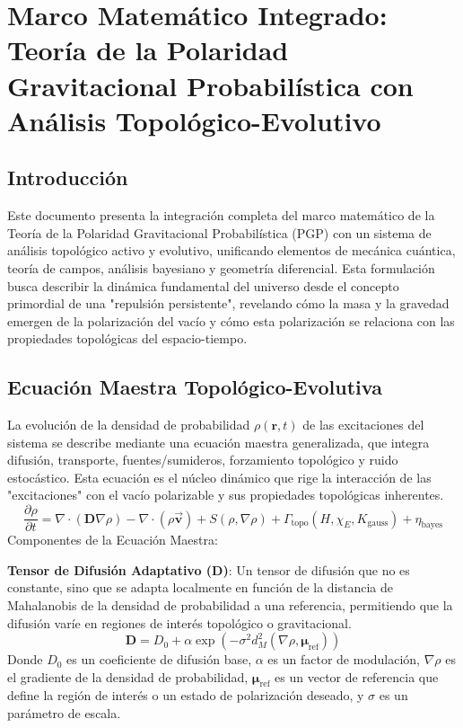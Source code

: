 \documentclass{book}
\newcommand{\bvec}[1]{\vec{\mathbf{#1}}}
\begin{document}
\chapter*{Marco Matemático Integrado: Teoría de la Polaridad Gravitacional Probabilística con Análisis Topológico-Evolutivo}

\section*{Introducción}
Este documento presenta la integración completa del marco matemático de la Teoría de la Polaridad Gravitacional Probabilística (PGP) con un sistema de análisis topológico activo y evolutivo, unificando elementos de mecánica cuántica, teoría de campos, análisis bayesiano y geometría diferencial. Esta formulación busca describir la dinámica fundamental del universo desde el concepto primordial de una "repulsión persistente", revelando cómo la masa y la gravedad emergen de la polarización del vacío y cómo esta polarización se relaciona con las propiedades topológicas del espacio-tiempo.

\section{Ecuación Maestra Topológico-Evolutiva}
La evolución de la densidad de probabilidad $\rho(\mathbf{r},t)$ de las excitaciones del sistema se describe mediante una ecuación maestra generalizada, que integra difusión, transporte, fuentes/sumideros, forzamiento topológico y ruido estocástico. Esta ecuación es el núcleo dinámico que rige la interacción de las "excitaciones" con el vacío polarizable y sus propiedades topológicas inherentes.
\begin{equation}
    \frac{\partial\rho}{\partial t}=\nabla\cdot(\mathbf{D}\nabla\rho)-\nabla\cdot(\rho\bvec{v})+S(\rho,\nabla\rho)+\Gamma_{\text{topo}}(H,\chi_E,K_{\text{gauss}})+\eta_{\text{bayes}}
\end{equation}
Componentes de la Ecuación Maestra:

\textbf{Tensor de Difusión Adaptativo ($\mathbf{D}$)}: Un tensor de difusión que no es constante, sino que se adapta localmente en función de la distancia de Mahalanobis de la densidad de probabilidad a una referencia, permitiendo que la difusión varíe en regiones de interés topológico o gravitacional.
\begin{equation}
    \mathbf{D}=D_0+\alpha\exp(-\sigma^2d_M^2(\nabla\rho,\boldsymbol{\mu}_{\text{ref}}))
\end{equation}
Donde $D_0$ es un coeficiente de difusión base, $\alpha$ es un factor de modulación, $\nabla\rho$ es el gradiente de la densidad de probabilidad, $\boldsymbol{\mu}_{\text{ref}}$ es un vector de referencia que define la región de interés o un estado de polarización deseado, y $\sigma$ es un parámetro de escala.
\end{document}
